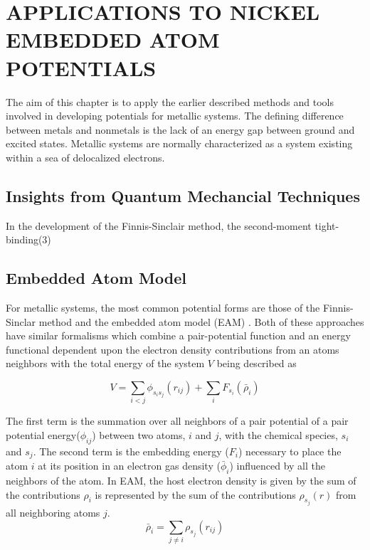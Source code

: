 \chapter{APPLICATIONS TO NICKEL EMBEDDED ATOM POTENTIALS}

The aim of this chapter is to apply the earlier described methods and tools involved in developing potentials for metallic systems.  The defining difference between metals and nonmetals is the lack of an energy gap between ground and excited states.  Metallic systems are normally characterized as a system existing within a sea of delocalized electrons.

\section{Insights from Quantum Mechancial Techniques}

In the development of the Finnis-Sinclair method, the second-moment tight-binding(3)
\section{Embedded Atom Model}

For metallic systems, the most common potential forms are those of the Finnis-Sinclar method\cite{finnis1984_fs} and the embedded atom model (EAM) \cite{daw1983_eam,daw1984_eam}.
Both of these approaches have similar formalisms which combine a pair-potential function and an energy functional dependent upon the electron density contributions from an atoms neighbors with the total energy of the system $V$ being described as

\begin{equation}
  V=\sum_{i<j}\phi_{s_i s_j}(r_{ij})
	+\sum_{i}F_{s_i}(\bar{\rho}_{i})
\end{equation}

The first term is the summation over all neighbors of a pair potential of a pair potential energy($\phi_{ij}$) between two atoms, $i$ and $j$, with the chemical species, $s_i$ and $s_j$.
The second term is the embedding energy ($F_i$) necessary to place the atom $i$ at its position in an electron gas density ($\bar{\phi}_i$) influenced by all the neighbors of the atom.
In EAM, the host electron density is given by the sum of the contributions $\rho_i$ is represented by the sum of the contributions $\rho_{s_j}(r)$ from all neighboring atoms $j$.
\begin{equation}
	\bar{\rho}_i = \sum_{j \neq i} \rho_{s_j}(r_{ij})
\end{equation}

